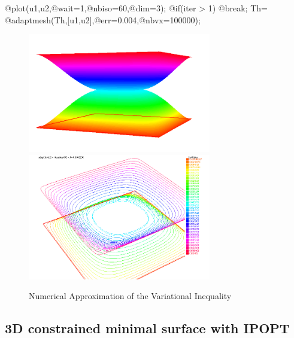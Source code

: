 \documentclass[a4paper,twoside,12pt]{book}
\begin{document}
\begin{example}
{@plot(u1,u2,@wait=1,@nbiso=60,@dim=3);
@if(iter > 1) @break;
Th= @adaptmesh(Th,[u1,u2],@err=0.004,@nbvx=100000);
}
\eFF
\begin{figure}
\includegraphics[width=8cm] {VarIneqFill}
\includegraphics[width=8cm] {VarIneqIso}
\caption{Numerical Approximation of the Variational Inequality \label{VarIneqF}}
\end{figure}

\end{example}

\subsection{3D constrained minimal surface with IPOPT}
\end{document}
